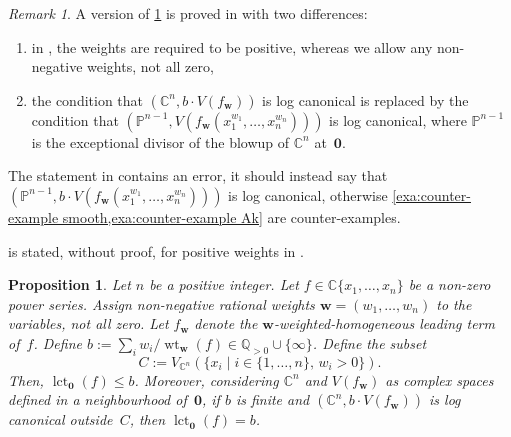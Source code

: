 \documentclass[a4paper, 12pt, oneside]{article}
\theoremstyle{plain}
\newtheorem{proposition}[theorem]{Proposition}
\theoremstyle{definition}
\theoremstyle{remark}
\newtheorem{remark}[theorem]{Remark}
\numberwithin{theorem}{section}
\numberwithin{table}{section}
\numberwithin{equation}{theorem}
\begin{document}
\begin{remark}
A version of \cref{thm:weighted formula power series} is proved in \cite[Proposition~8.14]{Kol97} with two differences:
\begin{enumerate}[label=(\arabic*), ref=\arabic*]
\item in \cite[Proposition~8.14]{Kol97}, the weights are required to be positive, whereas we allow any non-negative weights, not all zero,
\item the condition that $(\mathbb C^n, b \cdot V(f_{\bm w}))$ is log canonical is replaced by the condition that $(\mathbb P^{n-1}, V(f_{\bm w}(x_1^{w_1}, \ldots, x_n^{w_n})))$ is log canonical, where $\mathbb P^{n-1}$ is the exceptional divisor of the blowup of $\mathbb C^n$ at~$\bm 0$.
\end{enumerate}
The statement in \cite[Proposition~8.14]{Kol97} contains an error, it should instead say that $(\mathbb P^{n-1}, b \cdot V(f_{\bm w}(x_1^{w_1}, \ldots, x_n^{w_n})))$ is log canonical, otherwise \cref{exa:counter-example smooth,exa:counter-example Ak} are counter-examples.

 is stated, without proof, for positive weights in \cite[Proposition~2.1]{Kuw99}.
\end{remark}

\begin{proposition} \label{thm:weighted formula power series}
Let $n$ be a positive integer. Let $f \in \mathbb C\{x_1, \ldots, x_n\}$ be a non-zero power series. Assign non-negative rational weights $\bm w = (w_1, \ldots, w_n)$ to the variables, not all zero. Let $f_{\bm w}$ denote the $\bm w$-weighted-homogeneous leading term of~$f$. Define $b := \sum_i w_i / \operatorname{wt}_{\bm w}(f) \in \mathbb Q_{>0} \cup \{\infty\}$. Define the subset
\[
C := V_{\mathbb C^n}(\{x_i \mid i \in \{1, \ldots, n\},\, w_i > 0\}).
\]
Then, $\operatorname{lct}_{\bm 0}(f) \leq b$.
Moreover, considering $\mathbb C^n$ and $V(f_{\bm w})$ as complex spaces defined in a neighbourhood of~$\bm 0$, if $b$ is finite and $(\mathbb C^n, b \cdot V(f_{\bm w}))$ is log canonical outside~$C$, then $\operatorname{lct}_{\bm 0}(f) = b$.
\end{proposition}
\end{document}
